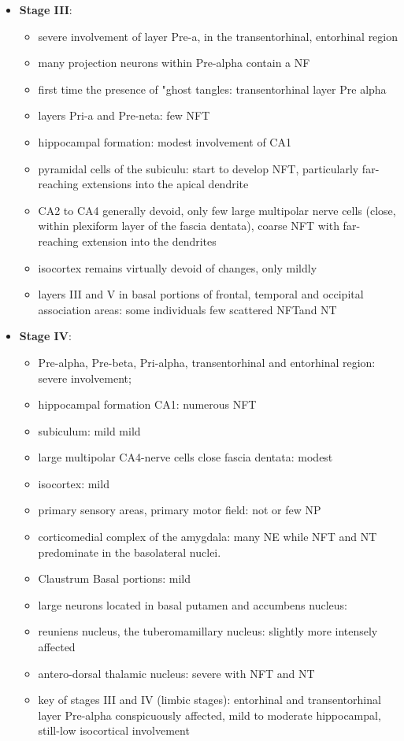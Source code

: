 \documentclass[fleqn]{article}\usepackage{caption}
\begin{document}
\begin{itemize}
\begin{itemize}
\item \textbf{Stage III}:
\begin{itemize}
\item severe involvement of layer Pre-a,  in the transentorhinal, entorhinal region
\item many projection neurons within Pre-alpha contain a NF
\item first time the presence of "ghost tangles: transentorhinal layer Pre alpha 
\item layers Pri-a and Pre-neta: few NFT
\item hippocampal formation: modest involvement of CA1 
\item pyramidal cells of the subiculu: start to develop NFT, particularly far-reaching extensions into the apical dendrite \item CA2 to CA4 generally devoid, only few large multipolar nerve cells (close, within plexiform layer of the fascia dentata),  coarse NFT with far-reaching extension into the dendrites 
\item isocortex remains virtually devoid of changes, only mildly 
\item layers III and V in basal portions of frontal, temporal and occipital association areas: some individuals few scattered NFTand NT
\end{itemize}

\item \textbf{Stage IV}:
\begin{itemize}
\item Pre-alpha, Pre-beta, Pri-alpha, transentorhinal and entorhinal region: severe involvement; 
\item hippocampal formation CA1: numerous NFT
\item subiculum: mild mild 
\item large multipolar CA4-nerve cells close fascia dentata: modest
\item isocortex: mild
\item primary sensory areas, primary motor field: not or few NP
\item corticomedial complex of the amygdala:  many NE while NFT and NT predominate in the basolateral nuclei.
\item Claustrum Basal portions: mild
\item large neurons located in basal putamen and  accumbens nucleus: 

\item reuniens nucleus, the tuberomamillary nucleus: slightly more intensely affected
\item antero-dorsal thalamic nucleus: severe with NFT and NT 
\item key of stages III and IV (limbic stages): entorhinal and transentorhinal layer Pre-alpha conspicuously affected, mild
to moderate hippocampal, still-low isocortical involvement



\end{itemize}
\end{itemize}
\end{itemize}
\end{document}
